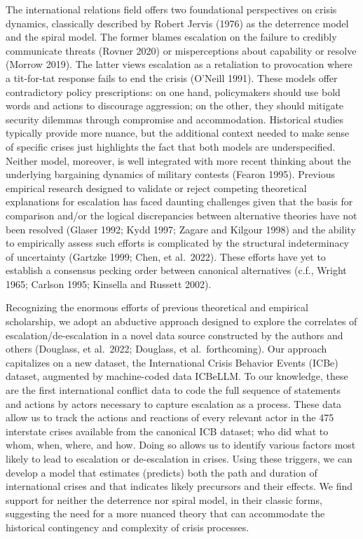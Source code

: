 \documentclass[
  letterpaper,
  DIV=11,
  numbers=noendperiod]{scrartcl}
\begin{document}
The international relations field offers two foundational perspectives
on crisis dynamics, classically described by Robert Jervis (1976) as the
deterrence model and the spiral model. The former blames escalation on
the failure to credibly communicate threats (Rovner 2020) or
misperceptions about capability or resolve (Morrow 2019). The latter
views escalation as a retaliation to provocation where a tit-for-tat
response fails to end the crisis (O'Neill 1991). These models offer
contradictory policy prescriptions: on one hand, policymakers should use
bold words and actions to discourage aggression; on the other, they
should mitigate security dilemmas through compromise and accommodation.
Historical studies typically provide more nuance, but the additional
context needed to make sense of specific crises just highlights the fact
that both models are underspecified. Neither model, moreover, is well
integrated with more recent thinking about the underlying bargaining
dynamics of military contests (Fearon 1995). Previous empirical research
designed to validate or reject competing theoretical explanations for
escalation has faced daunting challenges given that the basis for
comparison and/or the logical discrepancies between alternative theories
have not been resolved (Glaser 1992; Kydd 1997; Zagare and Kilgour 1998)
and the ability to empirically assess such efforts is complicated by the
structural indeterminacy of uncertainty (Gartzke 1999; Chen, et
al.~2022). These efforts have yet to establish a consensus pecking order
between canonical alternatives (c.f., Wright 1965; Carlson 1995;
Kinsella and Russett 2002).

Recognizing the enormous efforts of previous theoretical and empirical
scholarship, we adopt an abductive approach designed to explore the
correlates of escalation/de-escalation in a novel data source
constructed by the authors and others (Douglass, et al.~2022; Douglass,
et al.~forthcoming). Our approach capitalizes on a new dataset, the
International Crisis Behavior Events (ICBe) dataset, augmented by
machine-coded data ICBeLLM. To our knowledge, these are the first
international conflict data to code the full sequence of statements and
actions by actors necessary to capture escalation as a process. These
data allow us to track the actions and reactions of every relevant actor
in the 475 interstate crises available from the canonical ICB dataset;
who did what to whom, when, where, and how. Doing so allows us to
identify various factors most likely to lead to escalation or
de-escalation in crises. Using these triggers, we can develop a model
that estimates (predicts) both the path and duration of international
crises and that indicates likely precursors and their effects. We find
support for neither the deterrence nor spiral model, in their classic
forms, suggesting the need for a more nuanced theory that can
accommodate the historical contingency and complexity of crisis
processes.
\end{document}
